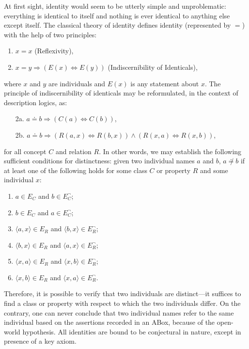 \documentclass[a4paper]{article}
\newcounter{ex}
\begin{document}
At first sight, identity would seem to be utterly simple and unproblematic:
everything is identical to itself and
nothing is ever identical to anything else except itself.
The classical theory of identity defines identity (represented by $=$)
with the help of two principles:
\begin{enumerate}
\item $x = x$ (Reflexivity),
\item $x = y \Rightarrow (E(x) \Leftrightarrow E(y))$ (Indiscernibility of Identicals),
\end{enumerate}
where $x$ and $y$ are individuals and $E(x)$ is any statement about $x$.
The principle of indiscernibility of identicals may be reformulated,
in the context of description logics, as:
\begin{enumerate}
\item[2a.] $a \doteq b \Rightarrow (C(a) \Leftrightarrow C(b))$,
\item[2b.] $a \doteq b \Rightarrow (R(a, x) \Leftrightarrow R(b, x)) \land (R(x, a) \Leftrightarrow R(x, b))$,
\end{enumerate}
for all concept $C$ and relation $R$.
In other words, we may establish the following sufficient conditions for distinctness:
given two individual names $a$ and $b$, $a \not\doteq b$ if at least one of the following holds
for some class $C$ or property $R$ and some individual $x$:
\begin{enumerate}
\item $a \in E_C$ and $b \in E_C^\neg$;
\item $b \in E_C$ and $a \in E_C^\neg$;
\item $\langle a, x\rangle \in E_R$ and $\langle b, x\rangle \in E_R^\neg$;
\item $\langle b, x\rangle \in E_R$ and $\langle a, x\rangle \in E_R^\neg$;
\item $\langle x, a\rangle \in E_R$ and $\langle x, b\rangle \in E_R^\neg$;
\item $\langle x, b\rangle \in E_R$ and $\langle x, a\rangle \in E_R^\neg$.
\end{enumerate}
Therefore, it is possible to verify that two individuals are distinct---it suffices
to find a class or property with respect to which the two individuals differ.
On the contrary, one can never conclude that two individual names refer to the same
individual based on the assertions recorded in an ABox, because of the open-world hypothesis.
All identities are bound to be conjectural in nature, except in presence of a key axiom.
\end{document}
